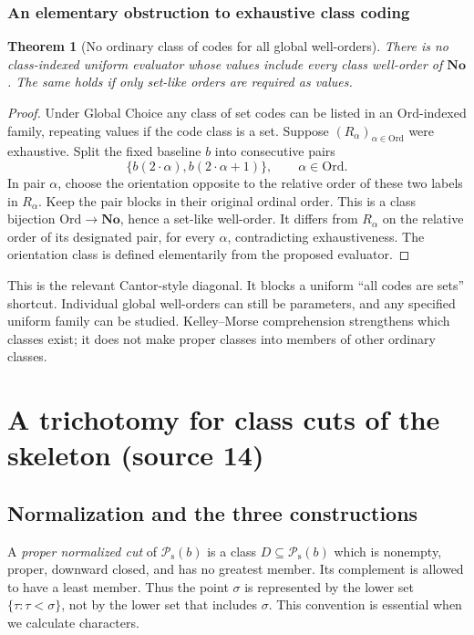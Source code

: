 \documentclass[11pt]{article}
\newtheorem{theorem}{Theorem}[section]
\theoremstyle{definition}
\theoremstyle{remark}
\newcommand{\No}{\mathbf{No}}
\newcommand{\Ord}{\mathrm{Ord}}
\newcommand{\Psupp}{\mathcal P_{\mathrm{s}}}
\begin{document}
\subsubsection{An elementary obstruction to exhaustive class coding}

\begin{theorem}[No ordinary class of codes for all global well-orders]
\label{swo:sh:thm:noncoding}
There is no class-indexed uniform evaluator whose values include every
class well-order of $\No$. The same holds if only set-like orders are
required as values.
\end{theorem}
\begin{proof}
Under Global Choice any class of set codes can be listed in an
$\Ord$-indexed family, repeating values if the code class is a set.
Suppose $(R_\alpha)_{\alpha\in\Ord}$ were exhaustive. Split the
fixed baseline $b$ into consecutive pairs
\[
 \{b(2\cdot\alpha),b(2\cdot\alpha+1)\},\qquad\alpha\in\Ord.
\]
In pair $\alpha$, choose the orientation opposite to the relative
order of these two labels in $R_\alpha$. Keep the pair blocks in
their original ordinal order. This is a class bijection
$\Ord\to\No$, hence a set-like well-order. It differs from
$R_\alpha$ on the relative order of its designated pair, for every
$\alpha$, contradicting exhaustiveness. The orientation class is
defined elementarily from the proposed evaluator.
\end{proof}

This is the relevant Cantor-style diagonal. It blocks a uniform
``all codes are sets'' shortcut. Individual global well-orders can
still be parameters, and any specified uniform family can be studied.
Kelley--Morse comprehension strengthens which classes exist; it does
not make proper classes into members of other ordinary classes.

\section{A trichotomy for class cuts of the skeleton (source 14)}
\label{swo:tc:sec:cuts}
\subsection{Normalization and the three constructions}
A \emph{proper normalized cut} of $\Psupp(b)$ is a class
$D\subseteq \Psupp(b)$ which is nonempty, proper, downward closed, and has
no greatest member. Its complement is allowed to have a least member.
Thus the point $\sigma$ is represented by the lower set
$\{\tau:\tau<\sigma\}$, not by the lower set that includes $\sigma$.
This convention is essential when we calculate characters.
\end{document}
